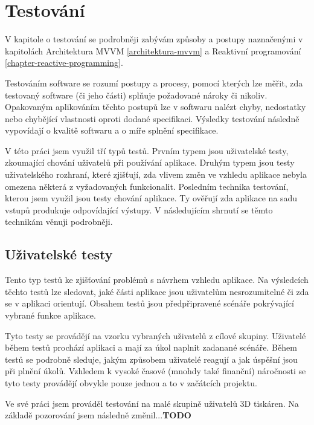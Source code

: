 \chapter{Testování}\label{testovani}

V kapitole o testování se podrobněji zabývám způsoby a postupy naznačenými v kapitolách Architektura MVVM \ref{architektura-mvvm} a Reaktivní programování \ref{chapter-reactive-programming}.

Testováním software se rozumí postupy a procesy, pomocí kterých lze měřit, zda testovaný software (či jeho části) splňuje požadované nároky či nikoliv.
Opakovaným aplikováním těchto postupů lze v softwaru nalézt chyby, nedostatky nebo chybějící vlastnosti oproti dodané specifikaci.
Výsledky testování následně vypovídají o kvalitě softwaru a o míře splnění specifikace. \cite{software-testing-definition}

V této práci jsem využil tří typů testů.
Prvním typem jsou uživatelské testy, zkoumající chování uživatelů při používání aplikace.
Druhým typem jsou testy uživatelského rozhraní, které zjišťují, zda vlivem změn ve vzhledu aplikace nebyla omezena některá z vyžadovaných funkcionalit.
Posledním technika testování, kterou jsem využil jsou testy chování aplikace.
Ty ověřují zda aplikace na sadu vstupů produkuje odpovídající výstupy.
V následujícím shrnutí se těmto technikám věnuji podrobněji.

\section{Uživatelské testy}\label{testovani-ux}

Tento typ testů ke zjišťování problémů s návrhem vzhledu aplikace.
Na výsledcích těchto testů lze sledovat, jaké části aplikace jsou uživatelům nesrozumitelné či zda se v aplikaci orientují.
Obsahem testů jsou předpřipravené scénáře pokrývající vybrané funkce aplikace. \cite{dobry-web-ux-testing}

Tyto testy se provádějí na vzorku vybraných uživatelů z cílové skupiny.
Uživatelé během testů prochází aplikaci a mají za úkol naplnit zadanané scénáře.
Během testů se podrobně sleduje, jakým způsobem uživatelé reagují a jak úspěšní jsou při plnění úkolů.
Vzhledem k vysoké časové (mnohdy také finanční) náročnosti se tyto testy provádějí obvykle pouze jednou a to v začátcích projektu. \cite{h1-ux-testing}

Ve své práci jsem prováděl testování na malé skupině uživatelů 3D tiskáren.
Na základě pozorování jsem následně změnil...\textbf{TODO}

